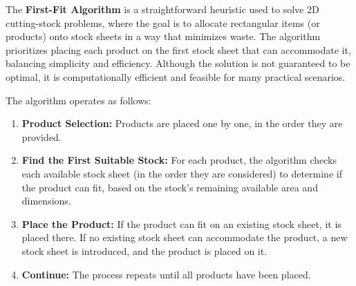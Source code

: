 \documentclass[a4paper]{article}
\begin{document}
    The \textbf{First-Fit Algorithm} is a straightforward heuristic used to solve 2D cutting-stock problems, where the goal is to allocate rectangular items (or products) onto stock sheets in a way that minimizes waste. The algorithm prioritizes placing each product on the first stock sheet that can accommodate it, balancing simplicity and efficiency. Although the solution is not guaranteed to be optimal, it is computationally efficient and feasible for many practical scenarios.
    
    The algorithm operates as follows:
    \begin{enumerate}
        \item \textbf{Product Selection:} Products are placed one by one, in the order they are provided.
        \item \textbf{Find the First Suitable Stock:} For each product, the algorithm checks each available stock sheet (in the order they are considered) to determine if the product can fit, based on the stock's remaining available area and dimensions.
        \item \textbf{Place the Product:} If the product can fit on an existing stock sheet, it is placed there. If no existing stock sheet can accommodate the product, a new stock sheet is introduced, and the product is placed on it.
        \item \textbf{Continue:} The process repeats until all products have been placed.
    \end{enumerate}
    
\end{document}
